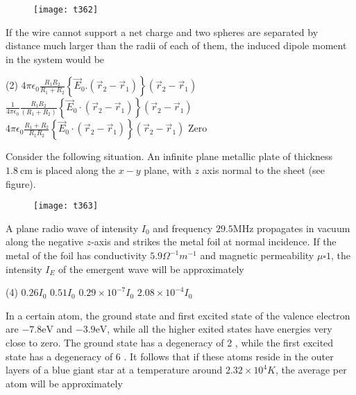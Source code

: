 \begin{questions}
\begin{minipage}{\textwidth}
	\begin{figure}[H]
		\centering
		\texttt{[image: t362]}
	\end{figure}
	If the wire cannot support a net charge and two spheres are separated by distance much larger than the radii of each of them, the induced dipole moment in the system would be
\end{minipage}
\begin{tasks}(2)
	\task[\textbf{A.}] $4 \pi \epsilon_{0} \frac{R_{1} R_{2}}{R_{1}+R_{2}}\left\{\vec{E}_{0} .\left(\vec{r}_{2}-\vec{r}_{1}\right)\right\}\left(\vec{r}_{2}-\vec{r}_{1}\right)$
	\task[\textbf{B.}] $\frac{1}{4 \pi \epsilon_{0}} \frac{R_{1} R_{2}}{\left(R_{1}+R_{2}\right)}\left\{\vec{E}_{0} \cdot\left(\vec{r}_{2}-\vec{r}_{1}\right)\right\}\left(\vec{r}_{2}-\vec{r}_{1}\right)$
	\task[\textbf{C.}] $4 \pi \epsilon_{0} \frac{R_{1}+R_{2}}{R_{1} R_{2}}\left\{\vec{E}_{0} \cdot\left(\vec{r}_{2}-\vec{r}_{1}\right)\right\}\left(\vec{r}_{2}-\vec{r}_{1}\right)$
	\task[\textbf{D.}] Zero
\end{tasks}
\begin{minipage}{\textwidth}
	\question Consider the following situation.
	An infinite plane metallic plate of thickness $1.8 \mathrm{~cm}$ is placed along the $x-y$ plane, with $z$ axis normal to the sheet (see figure).\\
	\begin{figure}[H]
		\centering
		\texttt{[image: t363]}
	\end{figure}
	A plane radio wave of intensity $I_{0}$ and frequency $29.5 \mathrm{MHz}$ propagates in vacuum along the negative $z$-axis and strikes the metal foil at normal incidence.
	If the metal of the foil has conductivity $5.9 \Omega^{-1} m^{-1}$ and magnetic permeability $\mu \square 1$, the intensity $I_{E}$ of the emergent wave will be approximately
\end{minipage}
\begin{tasks}(4)
	\task[\textbf{A.}]   $0.26 I_{0}$
	\task[\textbf{B.}] $0.51 I_{0}$
	\task[\textbf{C.}] $0.29 \times 10^{-7} I_{0}$
	\task[\textbf{D.}] $2.08 \times 10^{-4} I_{0}$
\end{tasks}
\begin{minipage}{\textwidth}
	\question In a certain atom, the ground state and first excited state of the valence electron are $-7.8 \mathrm{eV}$ and $-3.9 \mathrm{eV}$, while all the higher exited states have energies very close to zero. The ground state has a degeneracy of 2 , while the first excited state has a degeneracy of 6 . It follows that if these atoms reside in the outer layers of a blue giant star at a temperature around $2.32 \times 10^{4} K$, the average per atom will be approximately

\end{minipage}
\end{questions}

